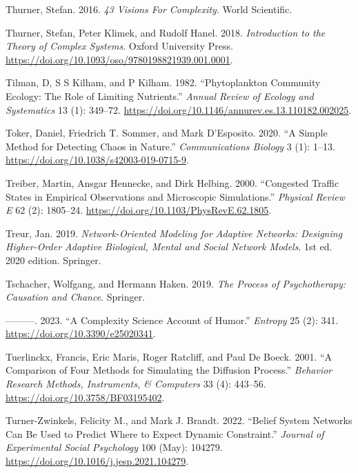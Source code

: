\documentclass[
  a4paper,
  DIV=11,
  numbers=noendperiod,
  oneside]{scrreprt}
\newlength{\cslhangindent}
\newenvironment{CSLReferences}[2] %
 {\begin{list}{}{%
  \setlength{\itemindent}{0pt}
  \setlength{\leftmargin}{0pt}
  \setlength{\parsep}{0pt}
  \ifodd #1
   \setlength{\leftmargin}{\cslhangindent}
   \setlength{\itemindent}{-1\cslhangindent}
  \fi
  \setlength{\itemsep}{#2\baselineskip}}}
 {\end{list}}
\begin{document}
\begin{CSLReferences}{1}{0}
Thurner, Stefan. 2016. \emph{43 Visions For Complexity}. World
Scientific.

Thurner, Stefan, Peter Klimek, and Rudolf Hanel. 2018.
\emph{Introduction to the {Theory} of {Complex Systems}}. Oxford
University Press.
\url{https://doi.org/10.1093/oso/9780198821939.001.0001}.

Tilman, D, S S Kilham, and P Kilham. 1982. {``Phytoplankton {Community
Ecology}: {The Role} of {Limiting Nutrients}.''} \emph{Annual Review of
Ecology and Systematics} 13 (1): 349--72.
\url{https://doi.org/10.1146/annurev.es.13.110182.002025}.

Toker, Daniel, Friedrich T. Sommer, and Mark D'Esposito. 2020. {``A
Simple Method for Detecting Chaos in Nature.''} \emph{Communications
Biology} 3 (1): 1--13. \url{https://doi.org/10.1038/s42003-019-0715-9}.

Treiber, Martin, Ansgar Hennecke, and Dirk Helbing. 2000. {``Congested
Traffic States in Empirical Observations and Microscopic Simulations.''}
\emph{Physical Review E} 62 (2): 1805--24.
\url{https://doi.org/10.1103/PhysRevE.62.1805}.

Treur, Jan. 2019. \emph{Network-Oriented Modeling for Adaptive Networks:
Designing Higher-Order Adaptive Biological, Mental and Social Network
Models}. 1st ed. 2020 edition. Springer.

Tschacher, Wolfgang, and Hermann Haken. 2019. \emph{The Process of
Psychotherapy: Causation and Chance}. Springer.

---------. 2023. {``A Complexity Science Account of Humor.''}
\emph{Entropy} 25 (2): 341. \url{https://doi.org/10.3390/e25020341}.

Tuerlinckx, Francis, Eric Maris, Roger Ratcliff, and Paul De Boeck.
2001. {``A Comparison of Four Methods for Simulating the Diffusion
Process.''} \emph{Behavior Research Methods, Instruments, \& Computers}
33 (4): 443--56. \url{https://doi.org/10.3758/BF03195402}.

Turner-Zwinkels, Felicity M., and Mark J. Brandt. 2022. {``Belief System
Networks Can Be Used to Predict Where to Expect Dynamic Constraint.''}
\emph{Journal of Experimental Social Psychology} 100 (May): 104279.
\url{https://doi.org/10.1016/j.jesp.2021.104279}.


\end{CSLReferences}
\end{document}
